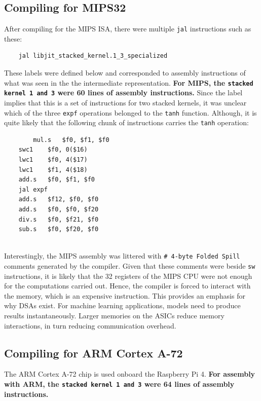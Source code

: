\documentclass[twocolumn]{article}
\newcommand{\cc}[1]{\texttt{#1}}
\begin{document}
\subsection{Compiling for MIPS32}
 
After compiling for the MIPS ISA, there were multiple \cc{jal} instructions such as these: 

\begin{lstlisting}
	jal	libjit_stacked_kernel.1_3_specialized
\end{lstlisting}

These labels were defined below and corresponded to assembly instructions of what was seen in the the intermediate representation. \textbf{For MIPS, the \cc{stacked kernel 1 and 3} were 60 lines of assembly instructions.} Since the label implies that this is a set of instructions for two stacked kernels, it was unclear which of the three \cc{expf} operations belonged to the \cc{tanh} function. Although, it is quite likely that the following chunk of instructions carries the \cc{tanh} operation: 

\begin{lstlisting}
        mul.s	$f0, $f1, $f0
	swc1	$f0, 0($16)
	lwc1	$f0, 4($17)
	lwc1	$f1, 4($18)
	add.s	$f0, $f1, $f0
	jal	expf
	add.s	$f12, $f0, $f0
	add.s	$f0, $f0, $f20
	div.s	$f0, $f21, $f0
	sub.s	$f0, $f20, $f0
\end{lstlisting}
\\
Interestingly, the MIPS assembly was littered with \cc{# 4-byte Folded Spill} comments generated by the compiler. Given that these comments were beside \cc{sw} instructions, it is likely that the 32 registers of the MIPS CPU were not enough for the computations carried out. Hence, the compiler is forced to interact with the memory, which is an expensive instruction. This provides an emphasis for why DSAs exist. For machine learning applications, models need to produce results instantaneously. Larger memories on the ASICs reduce memory interactions, in turn reducing communication overhead. 

\subsection{Compiling for ARM Cortex A-72}

The ARM Cortex A-72 chip is used onboard the Raspberry Pi 4. \textbf{For assembly with ARM, the \cc{stacked kernel 1 and 3} were 64 lines of assembly instructions.} \\
\end{document}
